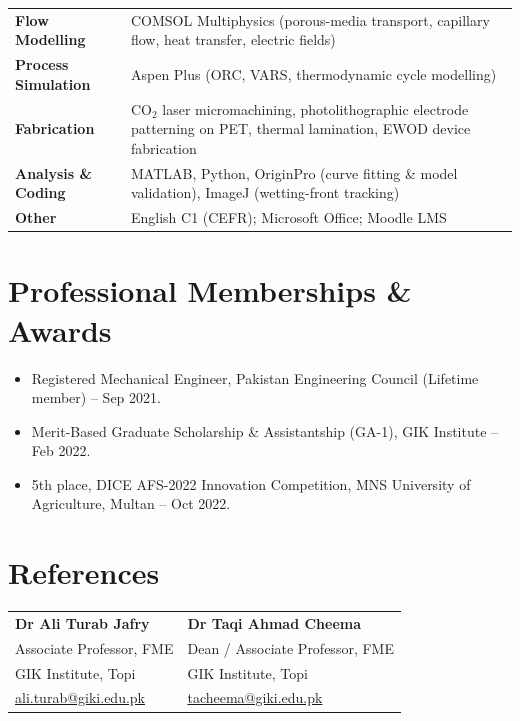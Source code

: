 \documentclass[11pt,a4paper]{article}
\begin{document}
\begin{tabularx}{\textwidth}{@{}>{\bfseries}lX@{}}
Flow Modelling
  & COMSOL Multiphysics (porous-media transport, capillary flow, heat transfer,
    electric fields) \\[3pt]
Process Simulation
  & Aspen Plus (ORC, VARS, thermodynamic cycle modelling) \\[3pt]
Fabrication
  & CO$_2$ laser micromachining, photolithographic electrode patterning on PET,
    thermal lamination, EWOD device fabrication \\[3pt]
Analysis \& Coding
  & MATLAB, Python, OriginPro (curve fitting \& model validation), ImageJ
    (wetting-front tracking) \\[3pt]
Other
  & English C1 (CEFR); Microsoft Office; Moodle LMS \\
\end{tabularx}

\section{Professional Memberships \& Awards}
\begin{itemize}
  \item Registered Mechanical Engineer, Pakistan Engineering Council
        (Lifetime member) -- Sep 2021.
  \item Merit-Based Graduate Scholarship \& Assistantship (GA-1), GIK Institute
        -- Feb 2022.
  \item 5th place, DICE AFS-2022 Innovation Competition, MNS University of
        Agriculture, Multan -- Oct 2022.
\end{itemize}

\section{References}

\begin{tabularx}{\textwidth}{@{}XX@{}}
\textbf{Dr Ali Turab Jafry}       & \textbf{Dr Taqi Ahmad Cheema} \\
Associate Professor, FME          & Dean / Associate Professor, FME \\
GIK Institute, Topi               & GIK Institute, Topi \\
\href{mailto:ali.turab@giki.edu.pk}{ali.turab@giki.edu.pk}
  & \href{mailto:tacheema@giki.edu.pk}{tacheema@giki.edu.pk} \\
\end{tabularx}
\end{document}
